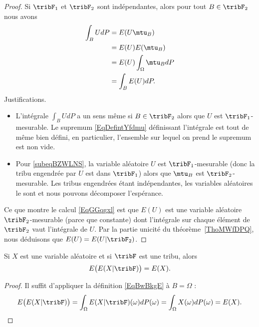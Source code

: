\begin{proof}
	Si \( \tribF_1\) et \( \tribF_2\) sont indépendantes, alors pour tout \( B\in\tribF_2\) nous avons
	\begin{subequations}    \label{EqGGqgxl}
		\begin{align}
			\int_B UdP & =E(U\mtu_B)                                \\
			           & =E(U)E(\mtu_B)         \label{subeqBZWLNS} \\
			           & =E(U)\int_{\Omega}\mtu_BdP                 \\
			           & =\int_B E(U)dP.
		\end{align}
	\end{subequations}
	Justifications.
	\begin{itemize}
		\item L'intégrale \( \int_BUdP\) a un sens même si \( B\in\tribF_2\) alors que \( U\) est \( \tribF_1\)-mesurable. Le supremum \eqref{EqDefintYfdmu} définissant l'intégrale est tout de même bien défini, en particulier, l'ensemble sur lequel on prend le supremum est non vide.
		\item
		      Pour \eqref{subeqBZWLNS}, la variable aléatoire \( U\) est \( \tribF_1\)-mesurable (donc la tribu engendrée par \( U\) est dans \( \tribF_1\)) alors que \( \mtu_B\) est \( \tribF_2\)-mesurable. Les tribus engendrées étant indépendantes, les variables aléatoires le sont et nous pouvons décomposer l'espérance.
	\end{itemize}
	Ce que montre le calcul \eqref{EqGGqgxl} est que \( E(U)\) est une variable aléatoire \( \tribF_2\)-mesurable (parce que constante) dont l'intégrale sur chaque élément de \( \tribF_2\) vaut l'intégrale de \( U\). Par la partie unicité du théorème~\ref{ThoMWfDPQ}, nous déduisons que \( E(U)=E(U|\tribF_2)\).
\end{proof}

\begin{corollary}   \label{CorakyvMp}
	Si \( X\) est une variable aléatoire et si \( \tribF\) est une tribu, alors
	\begin{equation}
		E\big( E(X|\tribF) \big)=E(X).
	\end{equation}
\end{corollary}

\begin{proof}
	Il suffit d'appliquer la définition \eqref{EqBwBkgE} à \( B=\Omega\) :
	\begin{equation}
		E\big( E(X|\tribF) \big)=\int_{\Omega}E(X|\tribF)(\omega)dP(\omega)=\int_{\Omega}X(\omega)dP(\omega)=E(X).
	\end{equation}
\end{proof}

